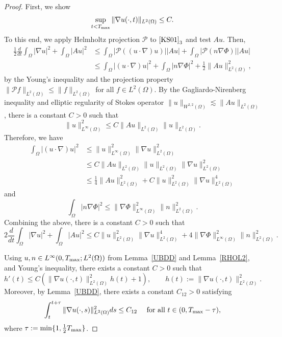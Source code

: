 \documentclass{amsart}
\numberwithin{equation}{section}
\begin{document}
\begin{proof}
First, we show
\begin{equation}\label{MAR210}
\sup_{t<T_{\rm max}}  \| \nabla u(\cdot,t)\|_{L^{2}(\Omega)}  \le C.
\end{equation}
To this end, we apply Helmholtz projection $\mathcal{P}$ to $\eqref{KS01}_{3}$ and
test $Au$. Then,
\[\begin{aligned}
\frac{1}{2}\frac{d}{dt}\int_{\Omega}|\nabla u|^{2}+\int_{\Omega}|Au|^{2}
&\le \int_{\Omega}|\mathcal{P}((u\cdot\nabla) u)||Au|+ \int_{\Omega}|\mathcal{P}(n\nabla \Phi)||Au|
\\&\le \int_{\Omega}|(u\cdot\nabla) u|^{2}+ \int_{\Omega}|n \nabla \Phi|^{2} + \frac{1}{2}\|Au\|^{2}_{L^{2}(\Omega)},
\end{aligned}\]
by the Young's inequality and the projection property $\|\mathcal{P}f\|_{L^{2}(\Omega)}\le \|f\|_{L^{2}(\Omega)}$ for all $f\in L^{2}(\Omega)$.
By the Gagliardo-Nirenberg inequality and elliptic regularity of Stokes operator $\| u\|_{W^{2,2}(\Omega)}\lesssim \|Au \|_{L^{2}(\Omega)}$, there is a constant $C>0$ such that 
\[
\|u\|^{2}_{L^{\infty}(\Omega)} 
\leq C \|Au \|_{L^{2}(\Omega)}\|u\|_{L^2(\Omega)}.
\]
Therefore, we have 
\[
\begin{aligned}
  \int_{\Omega}|(u\cdot\nabla) u|^{2} 
 &\le \|u\|_{L^{\infty}(\Omega)}^{2}\|\nabla u\|_{L^{2}(\Omega)}^{2}  
 \\&\le C\|Au\|_{L^{2}(\Omega)}\|  u\|_{L^{2}(\Omega)}\|\nabla u\|_{L^{2}(\Omega)}^{2}  
 \\ &\le \frac{1}{4}\|Au\|^{2}_{L^{2}(\Omega)} + C \|u\|^{2}_{L^{2}(\Omega)}\|\nabla u\|_{L^{2}(\Omega)}^{4} 
\end{aligned}
\]
and 
\[
 \int_{\Omega}|n \nabla \Phi|^{2} \le  \|\nabla \Phi\|_{L^{\infty}(\Omega)}^{2}\|n\|_{L^{2}(\Omega)}^{2}.
\]
    Combining the above, there is a constant $C>0$ such that 
\[
2\frac{d}{dt}\int_{\Omega}|\nabla u|^{2}+\int_{\Omega}|Au|^{2} \leq 
C \|u\|^{2}_{L^{2}(\Omega)}\|\nabla u\|_{L^{2}(\Omega)}^{4} + 4\|\nabla \Phi\|_{L^{\infty}(\Omega)}^{2}\|n\|_{L^{2}(\Omega)}^{2}.
\]

Using  $u,n\in L^{\infty}(0,T_{\rm max};L^{2}(\Omega))$  
from Lemma~\ref{UBDD} and Lemma~\ref{RHOL2},  and Young's inequality, there exists a constant $C>0$ such that 
\[
h'(t) \le C(\|\nabla u (\cdot, t) \|_{L^{2}(\Omega)}^{2}h(t) +1), \qquad h(t):=\|\nabla u(\cdot,t)\|_{L^{2}(\Omega)}^{2}.
\]
Moreover, by Lemma~\ref{UBDD}, there exists a constant $C_{12}>0$ satisfying
\[
\int_{t}^{t+\tau}\|\nabla u(\cdot,s)\|_{L^{2}(\Omega)}^{2}ds\le C_{12}\quad\mbox{ for all }t\in(0,T_{\rm max}-\tau),
\]
 where $\tau:=\min\{1,\frac{1}{2}T_{\rm max}\}$.  


\end{proof}
\end{document}
